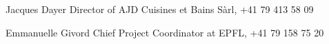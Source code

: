 \begin{cvskills}

	\cvskill
	{Jacques Dayer} %
	{Director of AJD Cuisines et Bains Sàrl, +41 79 413 58 09} %

	\cvskill
	{Emmanuelle Givord}
	{Chief Project Coordinator at EPFL, +41 79 158 75 20}





\end{cvskills}
